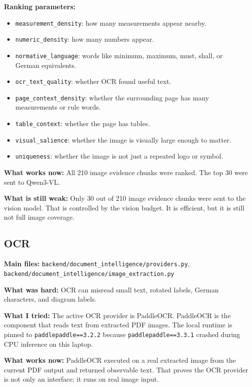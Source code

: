 \documentclass[11pt,a4paper]{article}
\begin{document}
\textbf{Ranking parameters:}
\begin{itemize}
  \item \texttt{measurement\_density}: how many measurements appear nearby.
  \item \texttt{numeric\_density}: how many numbers appear.
  \item \texttt{normative\_language}: words like minimum, maximum, must, shall, or German equivalents.
  \item \texttt{ocr\_text\_quality}: whether OCR found useful text.
  \item \texttt{page\_context\_density}: whether the surrounding page has many measurements or rule words.
  \item \texttt{table\_context}: whether the page has tables.
  \item \texttt{visual\_salience}: whether the image is visually large enough to matter.
  \item \texttt{uniqueness}: whether the image is not just a repeated logo or symbol.
\end{itemize}

\textbf{What works now:}
All 210 image evidence chunks were ranked. The top 30 were sent to Qwen3-VL.

\textbf{What is still weak:}
Only 30 out of 210 image evidence chunks were sent to the vision model. That is controlled by the vision budget. It is efficient, but it is still not full image coverage.

\subsection{OCR}
\textbf{Main files:} \texttt{backend/document\_intelligence/providers.py}, \texttt{backend/document\_intelligence/image\_extraction.py}

\textbf{What was hard:}
OCR can misread small text, rotated labels, German characters, and diagram labels.

\textbf{What I tried:}
The active OCR provider is PaddleOCR. PaddleOCR is the component that reads text from extracted PDF images. The local runtime is pinned to \texttt{paddlepaddle==3.2.2} because \texttt{paddlepaddle==3.3.1} crashed during CPU inference on this laptop.

\textbf{What works now:}
PaddleOCR executed on a real extracted image from the current PDF output and returned observable text. That proves the OCR provider is not only an interface; it runs on real image input.
\end{document}
